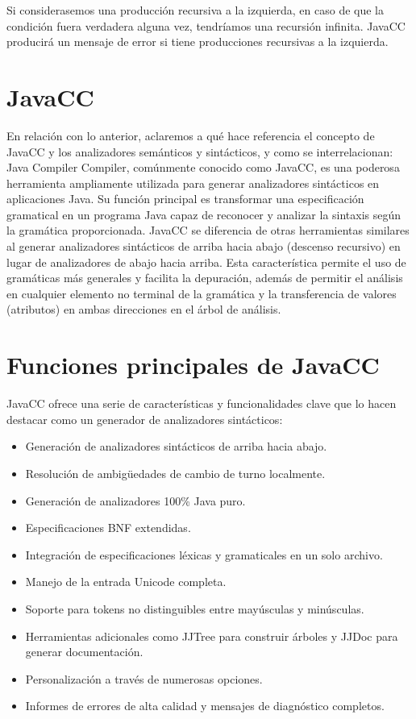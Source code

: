 Si considerasemos una producción recursiva a la izquierda, en caso de que la  condición fuera verdadera alguna vez, tendríamos una recursión infinita.
JavaCC producirá un mensaje de error si tiene producciones recursivas a la izquierda.

\section{JavaCC}
En relación con lo anterior, aclaremos a qué hace referencia el concepto de JavaCC y los analizadores semánticos y sintácticos, y como se interrelacionan:
Java Compiler Compiler, comúnmente conocido como JavaCC, es una poderosa herramienta ampliamente utilizada para generar analizadores sintácticos en aplicaciones Java. Su función principal es transformar una especificación gramatical en un programa Java capaz de reconocer y analizar la sintaxis según la gramática proporcionada.
JavaCC se diferencia de otras herramientas similares al generar analizadores sintácticos de arriba hacia abajo (descenso recursivo) en lugar de analizadores de abajo hacia arriba. Esta característica permite el uso de gramáticas más generales y facilita la depuración, además de permitir el análisis en cualquier elemento no terminal de la gramática y la transferencia de valores (atributos) en ambas direcciones en el árbol de análisis.

\section{Funciones principales de JavaCC}
JavaCC ofrece una serie de características y funcionalidades clave que lo hacen destacar como un generador de analizadores sintácticos:
\begin{itemize}
	\item Generación de analizadores sintácticos de arriba hacia abajo.
	\item Resolución de ambigüedades de cambio de turno localmente.
	\item Generación de analizadores 100\% Java puro.
	\item Especificaciones BNF extendidas.
	\item Integración de especificaciones léxicas y gramaticales en un solo archivo.
	\item Manejo de la entrada Unicode completa.
	\item Soporte para tokens no distinguibles entre mayúsculas y minúsculas.
	\item Herramientas adicionales como JJTree para construir árboles y JJDoc para generar documentación.
	\item Personalización a través de numerosas opciones.
	\item Informes de errores de alta calidad y mensajes de diagnóstico completos.
\end{itemize}


